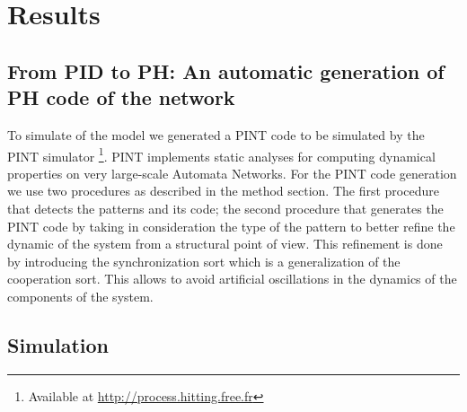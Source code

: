 
\section{Results}

\subsection{From PID to PH: An automatic generation of PH code of the network}

To simulate of the model we generated a PINT code to be simulated by the PINT simulator \footnote{Available at \url{http://process.hitting.free.fr}}. 
PINT implements static analyses for computing dynamical properties on very large-scale Automata Networks.
For the PINT code generation we use two procedures as described in the method section. The first procedure that detects the patterns and its code; the second 
procedure that generates the PINT code by taking in consideration the type of the pattern to better refine the dynamic of the system from a structural point of view.
This refinement is done by introducing the synchronization sort  which is a generalization of the cooperation sort. This allows  to avoid artificial oscillations
in the dynamics of the components of the system.




\subsection{Simulation}

